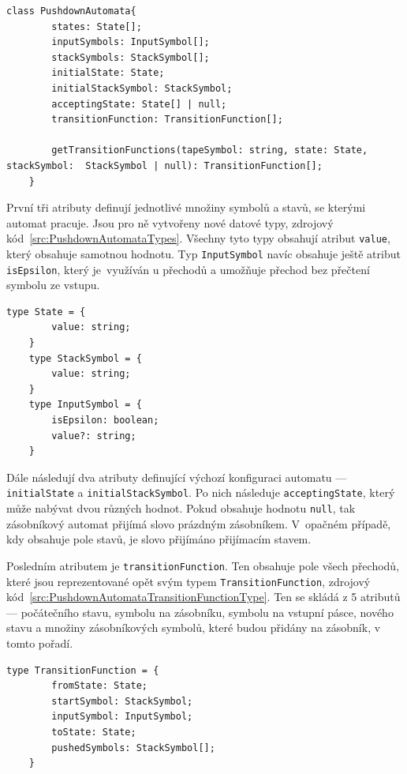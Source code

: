 \begin{lstlisting}[label=src:PushdownAutomataDefinition, caption={Deklarace třídy PushdownAutomata}]
    class PushdownAutomata{
        states: State[];
        inputSymbols: InputSymbol[];
        stackSymbols: StackSymbol[];
        initialState: State;
        initialStackSymbol: StackSymbol;
        acceptingState: State[] | null;
        transitionFunction: TransitionFunction[];

        getTransitionFunctions(tapeSymbol: string, state: State, stackSymbol:  StackSymbol | null): TransitionFunction[];
    }
\end{lstlisting}

První tři atributy definují jednotlivé množiny symbolů a stavů, se kterými automat pracuje. Jsou pro ně vytvořeny nové datové typy, zdrojový kód~\ref{src:PushdownAutomataTypes}. Všechny tyto typy obsahují atribut \texttt{value}, který obsahuje samotnou hodnotu. Typ \texttt{InputSymbol} navíc obsahuje ještě atribut \texttt{isEpsilon}, který je~využíván u přechodů a umožňuje přechod bez přečtení symbolu ze vstupu.

\begin{lstlisting}[label=src:PushdownAutomataTypes, caption={Datové typy State, StackSymbol, InputSymbol}]
    type State = {
        value: string;
    }
    type StackSymbol = {
        value: string;
    }
    type InputSymbol = {
        isEpsilon: boolean;
        value?: string;
    }
\end{lstlisting}

Dále následují dva atributy definující výchozí konfiguraci automatu --- \texttt{initialState} a \texttt{initialStackSymbol}. Po nich následuje \texttt{acceptingState}, který může nabývat dvou různých hodnot. Pokud obsahuje hodnotu \texttt{null}, tak zásobníkový automat přijímá slovo prázdným zásobníkem. V~opačném případě, kdy obsahuje pole stavů, je slovo přijímáno přijímacím stavem.

Posledním atributem je \texttt{transitionFunction}. Ten obsahuje pole všech přechodů, které jsou reprezentované opět svým typem \texttt{TransitionFunction}, zdrojový kód~\ref{src:PushdownAutomataTransitionFunctionType}. Ten se skládá z 5 atributů --- počátečního stavu, symbolu na zásobníku, symbolu na vstupní pásce, nového stavu a množiny zásobníkových symbolů, které budou přidány na zásobník, v tomto pořadí.

\begin{lstlisting}[label=src:PushdownAutomataTransitionFunctionType, caption={Datový typ TransitionFunction}]
    type TransitionFunction = {
        fromState: State;
        startSymbol: StackSymbol;
        inputSymbol: InputSymbol;
        toState: State;
        pushedSymbols: StackSymbol[];
    }
\end{lstlisting}

